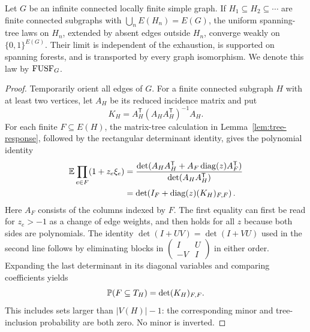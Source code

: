 \begin{proposition}\label{prop:free-limit}
Let $G$ be an infinite connected locally finite simple graph. If
$H_1\subseteq H_2\subseteq\cdots$ are finite connected subgraphs with
$\bigcup_n E(H_n)=E(G)$, the uniform spanning-tree laws on $H_n$, extended
by absent edges outside $H_n$, converge weakly on $\{0,1\}^{E(G)}$.
Their limit is independent of the exhaustion, is supported on spanning
forests, and is transported by every graph isomorphism. We denote this
law by $\FUSF_G$.
\end{proposition}

\begin{proof}
Temporarily orient all edges of $G$. For a finite connected subgraph $H$
with at least two vertices, let $A_H$ be its reduced incidence matrix and
put
\[
 K_H=A_H^{\mathsf T}(A_HA_H^{\mathsf T})^{-1}A_H.
\]
For each finite $F\subseteq E(H)$, the matrix-tree calculation in
Lemma~\ref{lem:tree-response}, followed by the rectangular determinant
identity, gives the polynomial identity
\begin{align}
 \E\prod_{e\in F}(1+z_e\xi_e)
 &=\frac{\det(A_HA_H^{\mathsf T}
        +A_F\operatorname{diag}(z)A_F^{\mathsf T})}
        {\det(A_HA_H^{\mathsf T})} \notag\\
 &=\det\!\left(I_F+\operatorname{diag}(z)(K_H)_{F,F}\right).
 \label{eq:finite-inclusion-polynomial}
\end{align}
Here $A_F$ consists of the columns indexed by $F$. The first equality
can first be read for $z_e>-1$ as a change of edge weights, and then
holds for all $z$ because both sides are polynomials. The identity
$\det(I+UV)=\det(I+VU)$ used in the second line follows by eliminating
blocks in $\left(\begin{smallmatrix}I&U\\-V&I\end{smallmatrix}\right)$
in either order. Expanding the last determinant in its diagonal variables
and comparing coefficients yields
\begin{equation}\label{eq:finite-inclusion-minor}
 \P(F\subseteq T_H)=\det (K_H)_{F,F}.
\end{equation}
This includes sets larger than $|V(H)|-1$: the corresponding minor and
tree-inclusion probability are both zero. No minor is inverted.


\end{proof}
